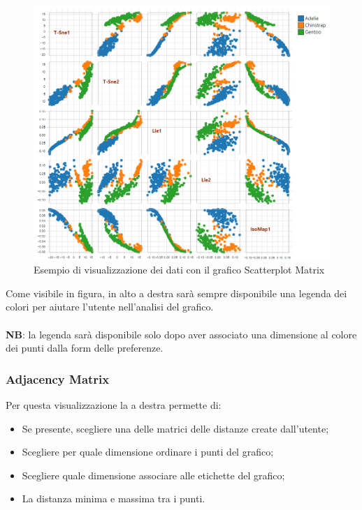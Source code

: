 \begin{figure}[H]
		\includegraphics[scale=0.6]{Images/ScatterplotMatrix.png}
		\centering
		\caption{Esempio di visualizzazione dei dati con il grafico Scatterplot Matrix}
\end{figure}

Come visibile in figura, in alto a destra sarà sempre disponibile una legenda dei colori per aiutare l'utente nell'analisi del grafico.\\\mbox{}\\ \textbf{NB}: la legenda sarà disponibile solo dopo aver associato una dimensione al colore dei punti dalla form delle preferenze.

\newpage

\subsubsection{Adjacency Matrix}

Per questa visualizzazione la  a destra permette di:
\begin{itemize}
	\item Se presente, scegliere una delle matrici delle distanze create dall'utente;
	\item Scegliere per quale dimensione ordinare i punti del grafico;
	\item Scegliere quale dimensione associare alle etichette del grafico;
	\item La distanza minima e massima tra i punti.
\end{itemize} 

